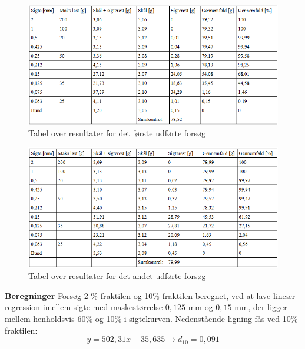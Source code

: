 \begin{figure}[htbp] \centering
	\begin{minipage}[b]{0.48\textwidth}\centering
		\includegraphics[width=1.7\textwidth]{billeder/forsogetsigteanalyse.png}
		\caption{Tabel over resultater for det første udførte forsøg}
		\label{fig:forsoget}
	\end{minipage}\hfill
\end{figure}

\begin{figure}[htbp] \centering
	\begin{minipage}[b]{0.48\textwidth}\centering
		\includegraphics[width=1.7\textwidth]{billeder/forsogtosigteanalyse.png}
		\caption{Tabel over resultater for det andet udførte forsøg}
		\label{fig:forsogto}
	\end{minipage}\hfill
\end{figure}

\textbf{Beregninger}
\newline
\underline{Forsøg 2}
\%-fraktilen og 10\%-fraktilen beregnet, ved at lave lineær regression imellem sigte med maskestørrelse $0,\!125$ mm og $0,\!15$ mm, der ligger mellem henholdsvis 60\% og 10\% i sigtekurven. 
\newline
\newline
Nedenstående ligning fås ved 10\%-fraktilen:
\begin{equation}
	y = 502,\!31x - 35,\!635 \rightarrow d_{10}=0,\!091
\end{equation}

